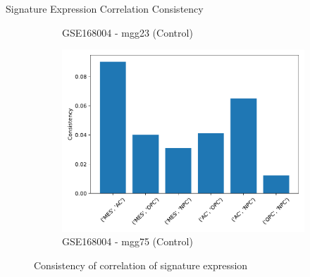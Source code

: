 \documentclass[aspectratio=169,9pt]{beamer}
\begin{document}
\begin{frame}{Signature Expression Correlation Consistency}
\begin{adjustwidth}{-5cm}{-5cm}
\begin{figure}
\begin{subfigure}[b]{0.38\textwidth}
                    \caption{GSE168004 - mgg23 (Control)}
                \end{subfigure}
                \begin{subfigure}[b]{0.38\textwidth}
                    \centering
                    \includegraphics[width=\textwidth]{mgg75_Consistency}
                    \caption{GSE168004 - mgg75 (Control)}
                \end{subfigure}
                \caption{Consistency of correlation of signature expression}
            \end{figure}
        \end{adjustwidth}
    \end{frame}
\end{document}
